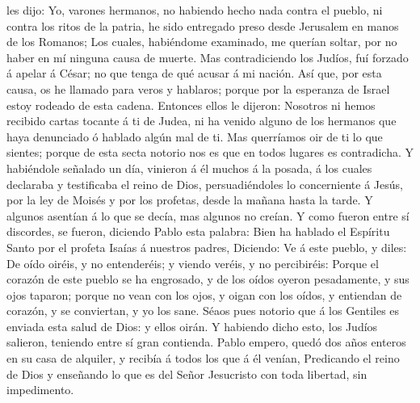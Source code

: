 les dijo: Yo, varones hermanos, no habiendo hecho nada contra el pueblo,
ni contra los ritos de la patria, he sido entregado preso desde
Jerusalem en manos de los Romanos;  Los cuales, habiéndome
examinado, me querían soltar, por no haber en mí ninguna causa de
muerte.  Mas contradiciendo los Judíos, fuí forzado á
apelar á César; no que tenga de qué acusar á mi nación. 
Así que, por esta causa, os he llamado para veros y hablaros; porque por
la esperanza de Israel estoy rodeado de esta cadena. 
Entonces ellos le dijeron: Nosotros ni hemos recibido cartas tocante á
ti de Judea, ni ha venido alguno de los hermanos que haya denunciado ó
hablado algún mal de ti.  Mas querríamos oir de ti lo que
sientes; porque de esta secta notorio nos es que en todos lugares es
contradicha.  Y habiéndole señalado un día, vinieron á él
muchos á la posada, á los cuales declaraba y testificaba el reino de
Dios, persuadiéndoles lo concerniente á Jesús, por la ley de Moisés y
por los profetas, desde la mañana hasta la tarde.  Y
algunos asentían á lo que se decía, mas algunos no creían. 
Y como fueron entre sí discordes, se fueron, diciendo Pablo esta
palabra: Bien ha hablado el Espíritu Santo por el profeta Isaías á
nuestros padres,  Diciendo: Ve á este pueblo, y diles: De
oído oiréis, y no entenderéis; y viendo veréis, y no percibiréis:
 Porque el corazón de este pueblo se ha engrosado, y de los
oídos oyeron pesadamente, y sus ojos taparon; porque no vean con los
ojos, y oigan con los oídos, y entiendan de corazón, y se conviertan, y
yo los sane.  Séaos pues notorio que á los Gentiles es
enviada esta salud de Dios: y ellos oirán.  Y habiendo
dicho esto, los Judíos salieron, teniendo entre sí gran contienda.
 Pablo empero, quedó dos años enteros en su casa de
alquiler, y recibía á todos los que á él venían, 
Predicando el reino de Dios y enseñando lo que es del Señor Jesucristo
con toda libertad, sin impedimento.

